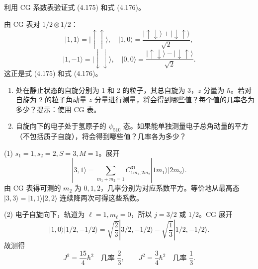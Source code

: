 \begin{question}
利用 CG 系数表验证式 (4.175) 和式 (4.176)。

\par\smallskip
{}

\end{question}
\begin{solution}

由 CG 表对 $1/2\otimes1/2$：
\[
|1,1\rangle=|\uparrow\uparrow\rangle,
\quad
|1,0\rangle=\frac{|\uparrow\downarrow\rangle+|\downarrow\uparrow\rangle}{\sqrt2},
\]
\[
|1,-1\rangle=|\downarrow\downarrow\rangle,
\quad
|0,0\rangle=\frac{|\uparrow\downarrow\rangle-|\downarrow\uparrow\rangle}{\sqrt2}.
\]
这正是式 (4.175) 和式 (4.176)。

\end{solution}

\begin{question}
\begin{enumerate}
\item 处在静止状态的自旋分别为 1 和 2 的粒子，其总自旋为 3，$z$ 分量为 $\hbar$。若对自旋为 2 的粒子角动量 $z$ 分量进行测量，将会得到哪些值？每个值的几率各为多少？提示：使用 CG 表。
\item 自旋向下的电子处于氢原子的 $\psi_{510}$ 态。如果能单独测量电子总角动量的平方（不包括质子自旋），将会得到哪些值？几率各为多少？
\end{enumerate}
\end{question}
\begin{solution}

(1) $s_1=1,s_2=2,S=3,M=1$。展开
\[
|3,1\rangle=\sum_{m_1+m_2=1}C_{1m_1,2m_2}^{31}|1m_1\rangle|2m_2\rangle.
\]
由 CG 表得可测的 $m_2$ 为 $0,1,2$，几率分别为对应系数平方。等价地从最高态 $|3,3\rangle=|1,1\rangle|2,2\rangle$ 连续降两次可得这些系数。

(2) 电子自旋向下，轨道为 $\ell=1,m_\ell=0$，所以 $j=3/2$ 或 $1/2$。CG 展开
\[
|1,0\rangle|1/2,-1/2\rangle
=\sqrt{\frac23}|3/2,-1/2\rangle-\sqrt{\frac13}|1/2,-1/2\rangle.
\]
故测得
\[
J^2=\frac{15}{4}\hbar^2\quad \text{几率 }\frac23,
\qquad
J^2=\frac34\hbar^2\quad \text{几率 }\frac13.
\]

\end{solution}

